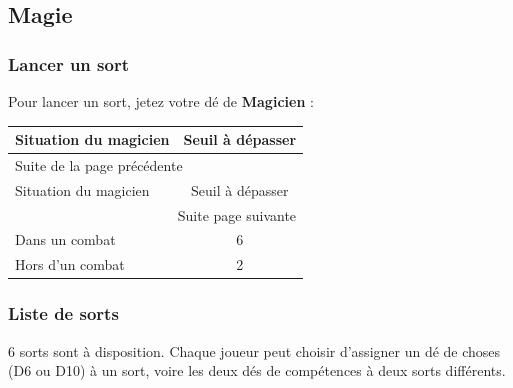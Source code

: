 \documentclass[a4paper, 11pt, twoside]{article}
\begin{document}
\subsection{Magie}
\label{sec:orgfbd939f}
\subsubsection{Lancer un sort}
\label{sec:orgdc8e505}

Pour lancer un sort, jetez votre dé de \textbf{Magicien} :

\begin{longtable}{l|c}
Situation du magicien & Seuil à dépasser\\
\hline
\endfirsthead
\multicolumn{2}{l}{Suite de la page précédente} \\
\hline

Situation du magicien & Seuil à dépasser \\

\hline
\endhead
\hline\multicolumn{2}{r}{Suite page suivante} \\
\endfoot
\endlastfoot
\hline
Dans un combat & 6\\
Hors d'un combat & 2\\
\end{longtable}

\subsubsection{Liste de sorts}
\label{sec:org33c9bca}

6 sorts sont à disposition. Chaque joueur peut choisir d'assigner un dé de choses (D6 ou D10) à un sort, voire les deux dés de compétences à deux sorts différents.

\newpage
\end{document}
